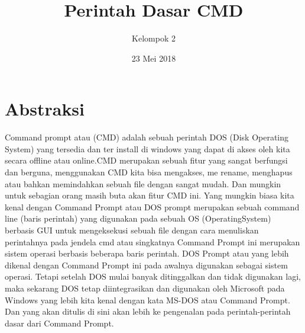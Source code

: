 \documentclass{article}
\title{Perintah Dasar CMD}
\author{Kelompok 2}
\date{23 Mei 2018}
\begin{document}
\maketitle

\section{Abstraksi}
Command prompt atau (CMD) adalah sebuah perintah DOS (Disk Operating System)  yang tersedia dan ter install di windows yang dapat di akses oleh kita secara offline atau online.CMD merupakan sebuah fitur yang sangat berfungsi dan berguna, menggunakan CMD kita bisa mengakses, me rename, menghapus atau bahkan memindahkan sebuah file dengan sangat mudah.
Dan mungkin untuk sebagian orang masih buta akan fitur CMD ini. Yang mungkin biasa kita kenal dengan Command Prompt atau DOS prompt merupakan sebuah command line (baris perintah) yang digunakan pada sebuah OS (OperatingSystem) berbasis GUI untuk mengeksekusi sebuah file dengan cara menuliskan perintahnya pada jendela cmd atau singkatnya Command Prompt ini merupakan sistem operasi berbasis beberapa baris perintah.
DOS Prompt atau yang lebih dikenal dengan Command Prompt ini pada awalnya digunakan sebagai sistem operasi. Tetapi setelah DOS mulai banyak ditinggalkan dan tidak digunakan lagi, maka sekarang DOS tetap diintegrasikan dan digunakan oleh Microsoft pada Windows yang lebih kita kenal dengan kata MS-DOS atau Command Prompt. Dan yang akan ditulis di sini akan lebih ke pengenalan pada perintah-perintah dasar dari Command Prompt.
\end{document}
